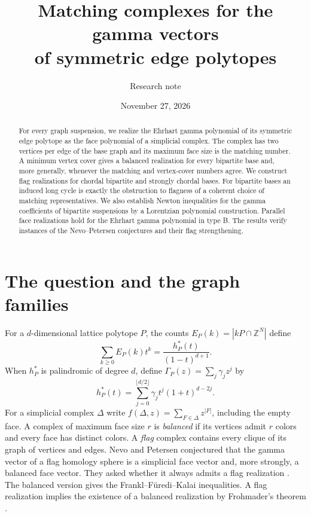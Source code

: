 \documentclass[11pt]{article}
\title{Matching complexes for the gamma vectors\\of symmetric edge polytopes}
\author{Research note}
\date{November 27, 2026}
\newcommand{\G}{\Gamma}
\newcommand{\ZZ}{\mathbb Z}
\begin{document}
\maketitle
\begin{abstract}
For every graph suspension, we realize the Ehrhart gamma polynomial of its symmetric edge polytope as the face polynomial of a simplicial complex. The complex has two vertices per edge of the base graph and its maximum face size is the matching number. A minimum vertex cover gives a balanced realization for every bipartite base and, more generally, whenever the matching and vertex-cover numbers agree. We construct flag realizations for chordal bipartite and strongly chordal bases. For bipartite bases an induced long cycle is exactly the obstruction to flagness of a coherent choice of matching representatives. We also establish Newton inequalities for the gamma coefficients of bipartite suspensions by a Lorentzian polynomial construction. Parallel face realizations hold for the Ehrhart gamma polynomial in type B. The results verify instances of the Nevo--Petersen conjectures and their flag strengthening.
\end{abstract}

\section{The question and the graph families}
For a $d$-dimensional lattice polytope $P$, the counts $E_P(k)=|kP\cap\ZZ^N|$ define
\[
 \sum_{k\ge0} E_P(k)t^k=\frac{h^*_P(t)}{(1-t)^{d+1}}.
\]
When $h^*_P$ is palindromic of degree $d$, define $\G_P(z)=\sum_j\gamma_j z^j$ by
\[
 h^*_P(t)=\sum_{j=0}^{\lfloor d/2\rfloor}\gamma_jt^j(1+t)^{d-2j}.
\]
For a simplicial complex $\Delta$ write $f(\Delta,z)=\sum_{F\in\Delta}z^{|F|}$, including the empty face. A complex of maximum face size $r$ is \emph{balanced} if its vertices admit $r$ colors and every face has distinct colors. A \emph{flag} complex contains every clique of its graph of vertices and edges. Nevo and Petersen conjectured that the gamma vector of a flag homology sphere is a simplicial face vector and, more strongly, a balanced face vector. They asked whether it always admits a flag realization \cite[Conj.~1.4, Conj.~6.3 and Problem~6.4]{NP}. The balanced version gives the Frankl--F\"uredi--Kalai inequalities. A flag realization implies the existence of a balanced realization by Frohmader's theorem \cite{Froh}.
\end{document}
